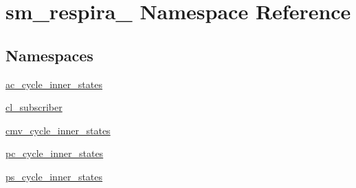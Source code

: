 \hypertarget{namespacesm__respira__1}{}\section{sm\+\_\+respira\+\_ Namespace Reference}
\label{namespacesm__respira__1}
\subsection*{Namespaces}
\begin{DoxyCompactItemize}
\item 
 \hyperlink{namespacesm__respira__1_1_1ac__cycle__inner__states}{ac\+\_\+cycle\+\_\+inner\+\_\+states}
\item 
 \hyperlink{namespacesm__respira__1_1_1cl__subscriber}{cl\+\_\+subscriber}
\item 
 \hyperlink{namespacesm__respira__1_1_1cmv__cycle__inner__states}{cmv\+\_\+cycle\+\_\+inner\+\_\+states}
\item 
 \hyperlink{namespacesm__respira__1_1_1pc__cycle__inner__states}{pc\+\_\+cycle\+\_\+inner\+\_\+states}
\item 
 \hyperlink{namespacesm__respira__1_1_1ps__cycle__inner__states}{ps\+\_\+cycle\+\_\+inner\+\_\+states}
\end{DoxyCompactItemize}
